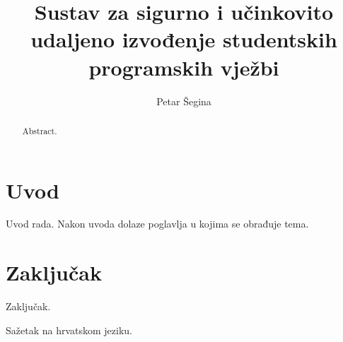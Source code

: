 \documentclass[times, utf8, zavrsni]{fer}
\begin{document}

\title{Sustav za sigurno i učinkovito udaljeno izvođenje studentskih programskih vježbi}

\author{Petar Šegina}

\maketitle

\izvornik

\zahvala{}

\tableofcontents

\chapter{Uvod}
Uvod rada. Nakon uvoda dolaze poglavlja u kojima se obrađuje tema.

\chapter{Zaključak}
Zaključak.




\begin{sazetak}
Sažetak na hrvatskom jeziku.

\end{sazetak}

\begin{abstract}
Abstract.

\end{abstract}
\end{document}
